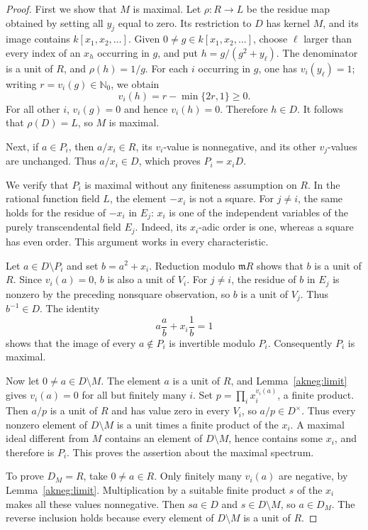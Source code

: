 \documentclass[11pt]{amsart}
\theoremstyle{definition}
\theoremstyle{remark}
\newcommand{\m}{\mathfrak m}
\begin{document}
\begin{proof}
First we show that $M$ is maximal.  Let $\rho:R\to L$ be the residue map
obtained by setting all $y_j$ equal to zero.  Its restriction to $D$ has
kernel $M$, and its image contains $k[x_1,x_2,\ldots]$.
Given $0\ne g\in k[x_1,x_2,\ldots]$, choose $\ell$ larger than every
index of an $x_h$ occurring in $g$, and put $h=g/(g^2+y_{\ell})$.
The denominator is a unit of $R$, and $\rho(h)=1/g$.
For each $i$ occurring in $g$, one has $v_i(y_{\ell})=1$; writing
$r=v_i(g)\in\mathbb N_0$, we obtain
\[
 v_i(h)=r-\min\{2r,1\}\ge0.
\]
For all other $i$, $v_i(g)=0$ and hence $v_i(h)=0$.
Therefore $h\in D$.  It follows that $\rho(D)=L$, so $M$ is maximal.

Next, if $a\in P_i$, then $a/x_i\in R$, its $v_i$-value is nonnegative,
and its other $v_j$-values are unchanged.  Thus $a/x_i\in D$,
which proves $P_i=x_iD$.

We verify that $P_i$ is maximal without any finiteness assumption on $R$.
In the rational function field $L$, the element $-x_i$ is not a square.
For $j\ne i$, the same holds for the residue of $-x_i$ in $E_j$:
$x_i$ is one of the independent variables of the purely transcendental
field $E_j$.  Indeed, its $x_i$-adic order is one, whereas a square has
even order.  This argument works in every characteristic.

Let $a\in D\setminus P_i$ and set $b=a^2+x_i$.  Reduction modulo
$\m R$ shows that $b$ is a unit of $R$.  Since $v_i(a)=0$, $b$ is also
a unit of $V_i$.  For $j\ne i$, the residue of $b$ in $E_j$ is nonzero
by the preceding nonsquare observation, so $b$ is a unit of $V_j$.
Thus $b^{-1}\in D$.  The identity
\[
 a\frac{a}{b}+x_i\frac1b=1
\]
shows that the image of every $a\notin P_i$ is invertible modulo $P_i$.
Consequently $P_i$ is maximal.

Now let $0\ne a\in D\setminus M$.  The element $a$ is a unit of $R$,
and Lemma~\ref{akneg:limit} gives $v_i(a)=0$ for all but finitely many $i$.
Set $p=\prod_i x_i^{v_i(a)}$, a finite product.  Then $a/p$ is a unit of
$R$ and has value zero in every $V_i$, so $a/p\in D^{\times}$.
Thus every nonzero element of $D\setminus M$ is a unit times a finite
product of the $x_i$.  A maximal ideal different from $M$ contains an
element of $D\setminus M$, hence contains some $x_i$, and therefore is
$P_i$.  This proves the assertion about the maximal spectrum.

To prove $D_M=R$, take $0\ne a\in R$.  Only finitely many $v_i(a)$ are
negative, by Lemma~\ref{akneg:limit}.  Multiplication by a suitable finite
product $s$ of the $x_i$ makes all these values nonnegative.  Then
$sa\in D$ and $s\in D\setminus M$, so $a\in D_M$.  The reverse inclusion
holds because every element of $D\setminus M$ is a unit of $R$.


\end{proof}
\end{document}
